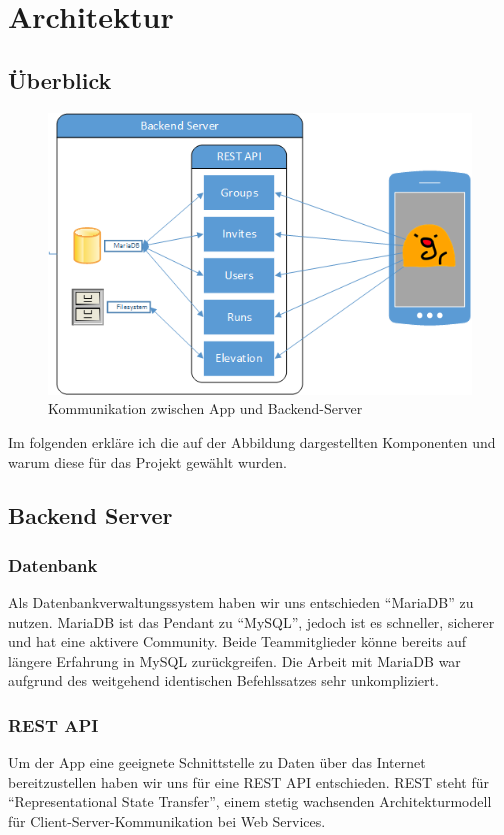 \section{Architektur}\label{kapitel2}
\subsection{Überblick}
\begin {figure}[htb]
\centering
\includegraphics{abb/network_diagram_visio}
\caption{Kommunikation zwischen App und Backend-Server}
\end{figure}
Im folgenden erkläre ich die auf der Abbildung dargestellten Komponenten und warum diese für das Projekt gewählt wurden.
\subsection{Backend Server}
\subsubsection{Datenbank}
Als Datenbankverwaltungssystem  haben wir uns entschieden ``MariaDB'' zu nutzen. MariaDB ist das Pendant zu ``MySQL'', jedoch ist es schneller, sicherer und hat eine aktivere Community.
Beide Teammitglieder könne bereits auf längere Erfahrung in MySQL zurückgreifen. Die Arbeit mit MariaDB war aufgrund des weitgehend identischen Befehlssatzes sehr unkompliziert.
\subsubsection{REST API}
Um der App eine geeignete Schnittstelle zu Daten über das Internet bereitzustellen haben wir uns für eine REST API entschieden.
REST steht für ``Representational State Transfer'', einem stetig wachsenden Architekturmodell für Client-Server-Kommunikation bei Web Services.
